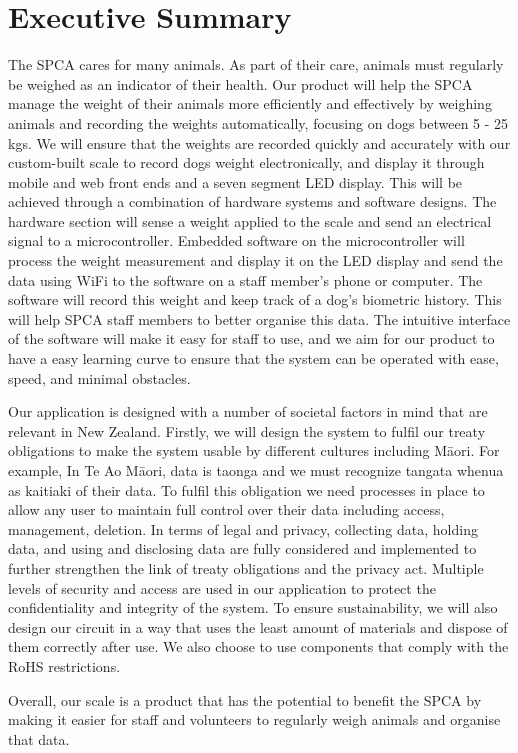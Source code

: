 
\chapter{Executive Summary}

The SPCA cares for many animals. As part of their care, animals must regularly be weighed as an indicator of their health. Our product will help the SPCA manage the weight of their animals more efficiently and effectively by weighing animals and recording the weights automatically, focusing on dogs between 5 - 25 kgs. We will ensure that the weights are recorded quickly and accurately with our custom-built scale to record dogs weight electronically, and display it through mobile and web front ends and a seven segment LED display. This will be achieved through a combination of hardware systems and software designs. The hardware section will sense a weight applied to the scale and send an electrical signal to a microcontroller. Embedded software on the microcontroller will process the weight measurement and display it on the LED display and send the data using WiFi to the software on a staff member’s phone or computer. The software will record this weight and keep track of a dog’s biometric history. This will help SPCA staff members to better organise this data. The intuitive interface of the software will make it easy for staff to use, and we aim for our product to have a easy learning curve to ensure that the system can be operated with ease, speed, and minimal obstacles.

Our application is designed with a number of societal factors in mind that are relevant in New Zealand. Firstly, we will design the system to fulfil our treaty obligations to make the system usable by different cultures including Māori. For example, In Te Ao Māori, data is taonga and we must recognize tangata whenua as kaitiaki of their data. To fulfil this obligation we need processes in place to allow any user to maintain full control over their data including access, management, deletion. In terms of legal and privacy, collecting data, holding data, and using and disclosing data are fully considered and implemented to further strengthen the link of treaty obligations and the privacy act. Multiple levels of security and access are used in our application to protect the confidentiality and integrity of the system. To ensure sustainability, we will also design our circuit in a way that uses the least amount of materials and dispose of them correctly after use. We also choose to use components that comply with the RoHS restrictions.

Overall, our scale is a product that has the potential to benefit the SPCA by making it easier  for staff and volunteers to regularly weigh animals and organise that data. 
